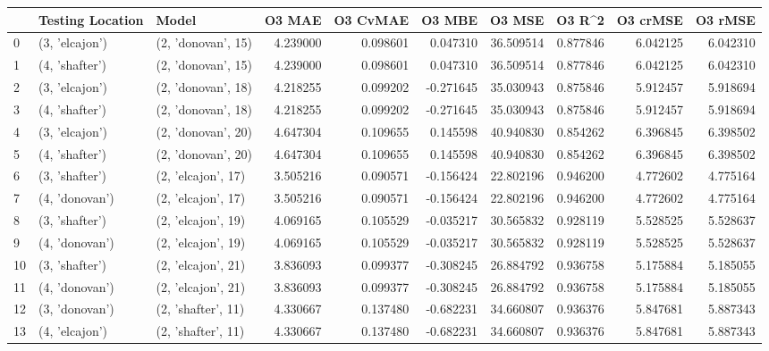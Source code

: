 \begin{tabular}{lllrrrrrrr}
\toprule
{} & Testing Location &               Model &    O3 MAE &  O3 CvMAE &    O3 MBE &     O3 MSE &    O3 R\textasciicircum2 &  O3 crMSE &   O3 rMSE \\
\midrule
0  &   (3, 'elcajon') &  (2, 'donovan', 15) &  4.239000 &  0.098601 &  0.047310 &  36.509514 &  0.877846 &  6.042125 &  6.042310 \\
1  &   (4, 'shafter') &  (2, 'donovan', 15) &  4.239000 &  0.098601 &  0.047310 &  36.509514 &  0.877846 &  6.042125 &  6.042310 \\
2  &   (3, 'elcajon') &  (2, 'donovan', 18) &  4.218255 &  0.099202 & -0.271645 &  35.030943 &  0.875846 &  5.912457 &  5.918694 \\
3  &   (4, 'shafter') &  (2, 'donovan', 18) &  4.218255 &  0.099202 & -0.271645 &  35.030943 &  0.875846 &  5.912457 &  5.918694 \\
4  &   (3, 'elcajon') &  (2, 'donovan', 20) &  4.647304 &  0.109655 &  0.145598 &  40.940830 &  0.854262 &  6.396845 &  6.398502 \\
5  &   (4, 'shafter') &  (2, 'donovan', 20) &  4.647304 &  0.109655 &  0.145598 &  40.940830 &  0.854262 &  6.396845 &  6.398502 \\
6  &   (3, 'shafter') &  (2, 'elcajon', 17) &  3.505216 &  0.090571 & -0.156424 &  22.802196 &  0.946200 &  4.772602 &  4.775164 \\
7  &   (4, 'donovan') &  (2, 'elcajon', 17) &  3.505216 &  0.090571 & -0.156424 &  22.802196 &  0.946200 &  4.772602 &  4.775164 \\
8  &   (3, 'shafter') &  (2, 'elcajon', 19) &  4.069165 &  0.105529 & -0.035217 &  30.565832 &  0.928119 &  5.528525 &  5.528637 \\
9  &   (4, 'donovan') &  (2, 'elcajon', 19) &  4.069165 &  0.105529 & -0.035217 &  30.565832 &  0.928119 &  5.528525 &  5.528637 \\
10 &   (3, 'shafter') &  (2, 'elcajon', 21) &  3.836093 &  0.099377 & -0.308245 &  26.884792 &  0.936758 &  5.175884 &  5.185055 \\
11 &   (4, 'donovan') &  (2, 'elcajon', 21) &  3.836093 &  0.099377 & -0.308245 &  26.884792 &  0.936758 &  5.175884 &  5.185055 \\
12 &   (3, 'donovan') &  (2, 'shafter', 11) &  4.330667 &  0.137480 & -0.682231 &  34.660807 &  0.936376 &  5.847681 &  5.887343 \\
13 &   (4, 'elcajon') &  (2, 'shafter', 11) &  4.330667 &  0.137480 & -0.682231 &  34.660807 &  0.936376 &  5.847681 &  5.887343 \\

\end{tabular}
